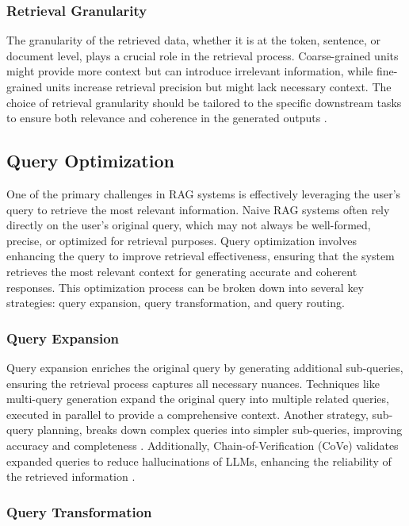 \subsubsection{Retrieval Granularity}

The granularity of the retrieved data, whether it is at the token, sentence, or document level, plays a crucial role in the retrieval process. Coarse-grained units might provide more context but can introduce irrelevant information, while fine-grained units increase retrieval precision but might lack necessary context. The choice of retrieval granularity should be tailored to the specific downstream tasks to ensure both relevance and coherence in the generated outputs \cite{gao2023retrieval}.

\subsection{Query Optimization}

One of the primary challenges in RAG systems is effectively leveraging the user's query to retrieve the most relevant information. Naive RAG systems often rely directly on the user’s original query, which may not always be well-formed, precise, or optimized for retrieval purposes. Query optimization involves enhancing the query to improve retrieval effectiveness, ensuring that the system retrieves the most relevant context for generating accurate and coherent responses. This optimization process can be broken down into several key strategies: query expansion, query transformation, and query routing.

\subsubsection{Query Expansion}

Query expansion enriches the original query by generating additional sub-queries, ensuring the retrieval process captures all necessary nuances. Techniques like multi-query generation expand the original query into multiple related queries, executed in parallel to provide a comprehensive context. Another strategy, sub-query planning, breaks down complex queries into simpler sub-queries, improving accuracy and completeness \cite{zhou2022least}. Additionally, Chain-of-Verification (CoVe) validates expanded queries to reduce hallucinations of LLMs, enhancing the reliability of the retrieved information \cite{dhuliawala2023chain}.

\subsubsection{Query Transformation}

